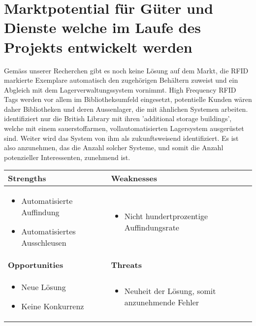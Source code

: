 \chapter{Marktpotential für Güter und Dienste welche im Laufe des Projekts entwickelt werden}

Gemäss unserer Recherchen gibt es noch keine Lösung auf dem Markt, die RFID markierte Exemplare automatisch den zugehörigen Behältern zuweist und ein Abgleich mit dem Lagerverwaltungssystem vornimmt. High Frequency RFID Tags werden vor allem im Bibliotheksumfeld eingesetzt, potentielle Kunden wären daher Bibliotheken und deren Aussenlager, die mit ähnlichen Systemen arbeiten. \citeauthor{Niederer2017} identifiziert nur die British Library mit ihren 'additional storage buildings', welche mit einem sauerstoffarmen, vollautomatisierten Lagersystem ausgerüstet sind. Weiter wird das System von ihm als zukunftsweisend identifiziert. Es ist also anzunehmen, das die Anzahl solcher Systeme, und somit die Anzahl potenzieller Interessenten, zunehmend ist.

\begin{table}[htb]
	\centering
	\begin{tabularx}{\textwidth}{|X|X|}
		\hline
		\textbf{Strengths} & \textbf{Weaknesses} \\
		\hline
		\begin{itemize}[noitemsep]
			\item Automatisierte Auffindung
			\item Automatisiertes Ausschleusen
		\end{itemize} & \begin{itemize}[noitemsep]
			\item Nicht hundertprozentige Auffindungsrate
		\end{itemize}
		\\
		\hline
		\textbf{Opportunities} & \textbf{Threats} \\
		\hline
		\begin{itemize}[noitemsep]
			\item Neue Lösung
			\item Keine Konkurrenz
		\end{itemize} & \begin{itemize}[noitemsep]
			\item Neuheit der Lösung, somit anzunehmende Fehler
		\end{itemize}
		\\
		\hline
	\end{tabularx}
\end{table}

